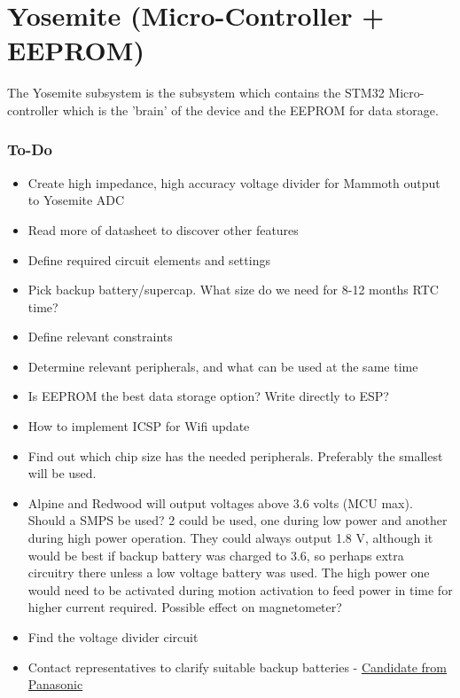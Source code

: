 \documentclass{article}
\begin{document}
\section{Yosemite (Micro-Controller + EEPROM)}
The Yosemite subsystem is the subsystem which contains the STM32 Micro-controller which is the 'brain' of the device and the EEPROM for data storage. 

\subsubsection{To-Do}
\begin{itemize}
    \item Create high impedance, high accuracy voltage divider for Mammoth output to Yosemite ADC
    \item Read more of datasheet to discover other features
    \item Define required circuit elements and settings
    \item Pick backup battery/supercap. What size do we need for 8-12 months RTC time?
    \item Define relevant constraints
    \item Determine relevant peripherals, and what can be used at the same time
    \item Is EEPROM the best data storage option? Write directly to ESP?
    \item How to implement ICSP for Wifi update
    \item Find out which chip size has the needed peripherals. Preferably the smallest will be used.
    \item Alpine and Redwood will output voltages above 3.6 volts (MCU max). Should a SMPS be used? 2 could be used, one during low power and another during high power operation. They could always output 1.8 V, although it would be best if backup battery was charged to 3.6, so perhaps extra circuitry there unless a low voltage battery was used. The high power one would need to be activated during motion activation to feed power in time for higher current required. Possible effect on magnetometer?
    \item Find the voltage divider circuit
    \item Contact representatives to clarify suitable backup batteries - \href{https://industrial.panasonic.com/content/data/BT/docs/edbd/ni_mh/Introduction\%20of\%20Nickel\%20Metal\%20Hydride\%20Battery_Web_20200203.pdf}{Candidate from Panasonic}
\end{itemize}
\end{document}
